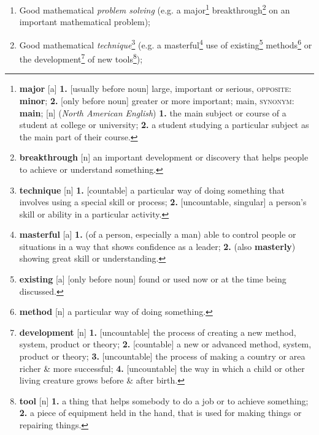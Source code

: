 \documentclass[oneside]{book}
\numberwithin{equation}{section}
\begin{document}
\begin{enumerate}
	\item Good mathematical \textit{problem solving} (e.g. a major\footnote{\textbf{major} [a] \textbf{1.} [usually before noun] large, important or serious, \textsc{opposite}: \textbf{minor}; \textbf{2.} [only before noun] greater or more important; main, \textsc{synonym}: \textbf{main}; [n] (\textit{North American English}) \textbf{1.} the main subject or course of a student at college or university; \textbf{2.} a student studying a particular subject as the main part of their course.} breakthrough\footnote{\textbf{breakthrough} [n] an important development or discovery that helps people to achieve or understand something.} on an important mathematical problem);
	\item Good mathematical \textit{technique}\footnote{\textbf{technique} [n] \textbf{1.} [countable] a particular way of doing something that involves using a special skill or process; \textbf{2.} [uncountable, singular] a person's skill or ability in a particular activity.} (e.g. a masterful\footnote{\textbf{masterful} [a] \textbf{1.} (of a person, especially a man) able to control people or situations in a way that shows confidence as a leader; \textbf{2.} (also \textbf{masterly}) showing great skill or understanding.} use of existing\footnote{\textbf{existing} [a] [only before noun] found or used now or at the time being discussed.} methods\footnote{\textbf{method} [n] a particular way of doing something.} or the development\footnote{\textbf{development} [n] \textbf{1.} [uncountable] the process of creating a new method, system, product or theory; \textbf{2.} [countable] a new or advanced method, system, product or theory; \textbf{3.} [uncountable] the process of making a country or area richer \& more successful; \textbf{4.} [uncountable] the way in which a child or other living creature grows before \& after birth.} of new tools\footnote{\textbf{tool} [n] \textbf{1.} a thing that helps somebody to do a job or to achieve something; \textbf{2.} a piece of equipment held in the hand, that is used for making things or repairing things.});

\end{enumerate}
\end{document}
